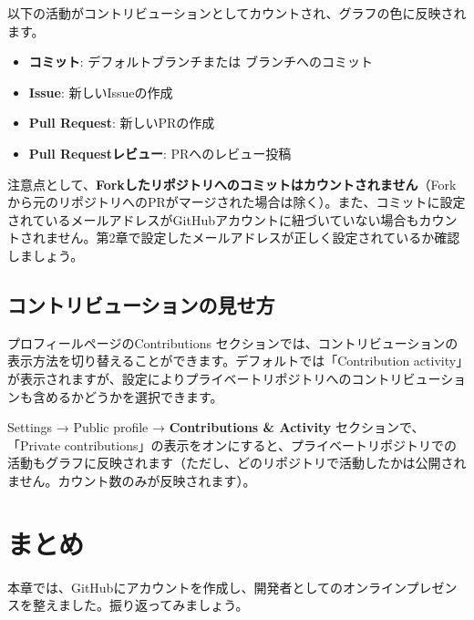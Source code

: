 以下の活動がコントリビューションとしてカウントされ、グラフの色に反映されます。

\begin{itemize}
  \item \textbf{コミット}: デフォルトブランチまたは  ブランチへのコミット
  \item \textbf{Issue}: 新しいIssueの作成
  \item \textbf{Pull Request}: 新しいPRの作成
  \item \textbf{Pull Requestレビュー}: PRへのレビュー投稿
\end{itemize}

注意点として、\textbf{Forkしたリポジトリへのコミットはカウントされません}（Forkから元のリポジトリへのPRがマージされた場合は除く）。また、コミットに設定されているメールアドレスがGitHubアカウントに紐づいていない場合もカウントされません。第2章で設定したメールアドレスが正しく設定されているか確認しましょう。

\subsection{コントリビューションの見せ方}

プロフィールページのContributions セクションでは、コントリビューションの表示方法を切り替えることができます。デフォルトでは「Contribution activity」が表示されますが、設定によりプライベートリポジトリへのコントリビューションも含めるかどうかを選択できます。

Settings → Public profile → \textbf{Contributions \& Activity} セクションで、「Private contributions」の表示をオンにすると、プライベートリポジトリでの活動もグラフに反映されます（ただし、どのリポジトリで活動したかは公開されません。カウント数のみが反映されます）。

\section{まとめ}

本章では、GitHubにアカウントを作成し、開発者としてのオンラインプレゼンスを整えました。振り返ってみましょう。

